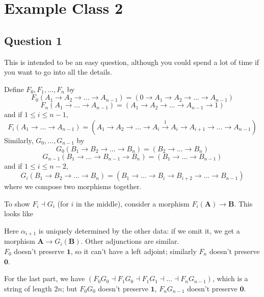 \documentclass[a4paper]{article}
\begin{document}
\newpage

\section{Example Class 2}

\subsection{Question 1}
This is intended to be an easy question, although you could spend a lot of time if you want to go into all the details.

Define $F_0,F_1,...,F_n$ by
$$F_0(A_1 \to A_2 \to ... \to A_{n-1}) = (0 \to A_1 \to A_2 \to ... \to A_{n-1})$$
$$F_n(A_1 \to ... \to A_{n-1}) = (A_1 \to A_2 \to ... \to A_{n-1} \to 1)$$
and if $1 \leq i \leq n-1$,
$$F_i (A_1 \to ... \to A_{n-1}) = (A_1 \to A_2 \to ... \to A_i \xrightarrow{1} A_i \to A_{i+1} \to ... \to A_{n-1})$$
Similarly, $G_0,...,G_{n-1}$ by 
$$G_0(B_1 \to B_2 \to ... \to B_n) = (B_2 \to ... \to B_n)$$
$$G_{n-1}(B_1 \to ... \to B_{n-1} \to B_n) = (B_1 \to ... \to B_{n-1})$$
and if $1 \leq i \leq n-2$,
$$G_i (B_1 \to B_2 \to ... \to B_n) =(B_1 \to ... \to B_i \to B_{i+2} \to ... \to B_{n-1})$$
where we compose two morphisms together.

To show $F_i \dashv G_i$ (for $i$ in the middle), consider a morphism $F_i(\mathbf{A}) \to \mathbf{B}$. This looks like

Here $\alpha_{i+1}$ is uniquely determined by the other data: if we omit it, we get a morphism $\mathbf{A} \to G_i (\mathbf{B})$. Other adjunctions are similar.\\
$F_0$ doesn't preserve $\mathbf{1}$, so it can't have a left adjoint; similarly $F_n$ doesn't preserve $\mathbf{0}$.

For the last part, we have $(F_0G_0 \dashv F_1G_0 \dashv F_1G_1 \dashv ... \dashv F_n G_{n-1})$, which is a string of length $2n$; but $F_0G_0$ doesn't preserve $\mathbf{1}$, $F_nG_{n-1}$ doesn't preserve $\mathbf{0}$.
\end{document}
